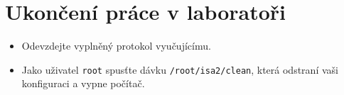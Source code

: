 \documentclass[a4paper,11pt]{article}
\begin{document}
\section{Ukončení práce v laboratoři}
\begin{itemize}
  \item Odevzdejte vyplněný protokol vyučujícímu. 
  \item Jako uživatel \texttt{root} spusťte dávku {\tt /root/isa2/clean}, která odstraní vaši konfiguraci a vypne počítač.
\end{itemize}
\end{document}
